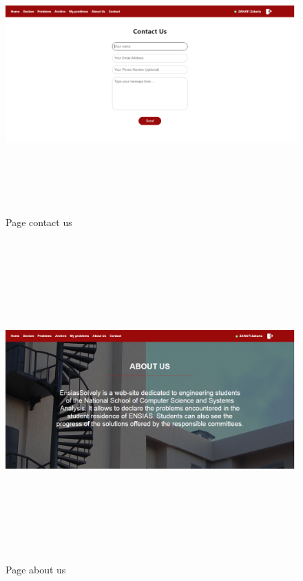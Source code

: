 \documentclass[11.5pt]{report}
\begin{document}
\newpage
\begin{figure}[h]
	
	\begin{center}
		\includegraphics[width=500pt,height=300pt]{contactus.png} 
		\caption{Page contact us}
	\end{center}
	
\end{figure}
\newpage
\begin{figure}[h]
	
	\begin{center}
		\includegraphics[width=500pt,height=350pt]{aboutus.png} 
		\caption{Page about us}
	\end{center}
	
\end{figure}
\newpage
\end{document}
